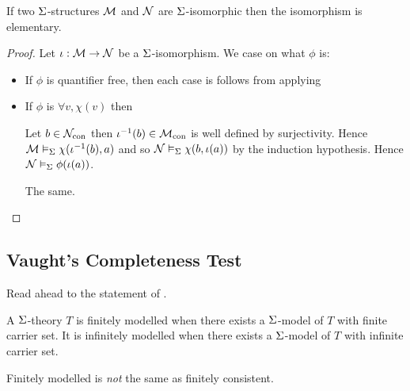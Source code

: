 \begin{prop}
    If two $\Sigma$-structures $\mathcal{M}$ and $\mathcal{N}$ 
    are $\Sigma$-isomorphic then the isomorphism is elementary.
\end{prop}
\begin{proof}
    Let $\iota : \mathcal{M} \to \mathcal{N}$ be a $\Sigma$-isomorphism.
    We case on what $\phi$ is:
    \begin{itemize}
        \item If $\phi$ is quantifier free, 
            then each case is follows from applying
        \item If $\phi$ is $\forall v, \chi(v)$ then
            \begin{forward}
                Let $b \in {\mathcal{N}}_\mathrm{con}$ then
                $\iota^{-1}(b) \in {\mathcal{M}}_\mathrm{con}$ is well defined by surjectivity.
                Hence $\mathcal{M} \vDash_{\Sigma} \chi(\iota^{-1}(b),a)$ and so
                $\mathcal{N} \vDash_{\Sigma} \chi(b,\iota(a))$ by the induction hypothesis.
                Hence $\mathcal{N} \vDash_{\Sigma} \phi(\iota(a))$.
            \end{forward}
            \begin{backward}
                The same.
            \end{backward}
    \end{itemize}
\end{proof}

\subsection{Vaught's Completeness Test}
Read ahead to the statement of .

\begin{dfn}
    A $\Sigma$-theory $T$ 
    is finitely modelled when
    there exists a $\Sigma$-model of $T$ 
    with finite carrier set.
    It is infinitely modelled when
    there exists a $\Sigma$-model of $T$ 
    with infinite carrier set.
\end{dfn}
Finitely modelled is \emph{not} the same as finitely consistent.

